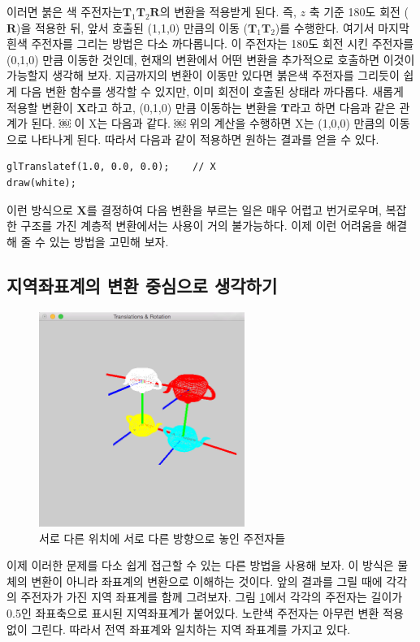 이러면 붉은 색 주전자는${\mathbf T}_1 {\mathbf T}_2  {\mathbf R}$의 변환을 적용받게 된다. 
즉, $z$ 축 기준 180도 회전 ($\mathbf R$)을 적용한 뒤, 앞서 호출된 (1,1,0) 만큼의 이동 (${\mathbf T}_1 {\mathbf T}_2$)를 수행한다.
여기서 마지막 흰색 주전자를 그리는 방법은 다소 까다롭니다. 이 주전자는 180도 회전 시킨 주전자를 (0,1,0) 만큼 이동한 것인데, 
현재의 변환에서 어떤 변환을 추가적으로 호출하면 이것이 가능할지 생각해 보자. 
지금까지의 변환이 이동만 있다면 붉은색 주전자를 그리듯이 쉽게 다음 변환 함수를 생각할 수 있지만, 이미 회전이 호출된 상태라 까다롭다.
새롭게 적용할 변환이 $\mathbf  X$라고 하고, (0,1,0) 만큼 이동하는 변환을 ${\mathbf T}$라고 하면 다음과 같은 관계가 된다.
￼
이 X는 다음과 같다.
￼
위의 계산을 수행하면 X는 (1,0,0) 만큼의 이동으로 나타나게 된다. 따라서 다음과 같이 적용하면 원하는 결과를 얻을 수 있다.

\begin{verbatim}
glTranslatef(1.0, 0.0, 0.0);	// X
draw(white);
\end{verbatim}

이런 방식으로 ${\mathbf  X}$를 결정하여 다음 변환을 부르는 일은 매우 어렵고 번거로우며, 
복잡한 구조를 가진 계층적 변환에서는 사용이 거의 불가능하다.
이제 이런 어려움을 해결해 줄 수 있는 방법을 고민해 보자.

\subsection{지역좌표계의 변환 중심으로 생각하기}

\begin{figure}[h!]
  \centering
    \includegraphics[height=7cm]{OGL_transform/localCoordXform.png}
    \caption{서로 다른 위치에 서로 다른 방향으로 놓인 주전자들}
    \label{fig:OGL_transform:localCoordXform}
\end{figure}

이제 이러한 문제를 다소 쉽게 접근할 수 있는 다른 방법을 사용해 보자. 이 방식은 물체의 변환이 아니라 좌표계의 변환으로 이해하는 것이다. 앞의 결과를 그릴 때에 각각의 주전자가 가진 지역 좌표계를 함께 그려보자. 그림 \ref{fig:OGL_transform:localCoordXform}에서 각각의 주전자는 길이가 0.5인 좌표축으로 표시된 지역좌표계가 붙어있다.
노란색 주전자는 아무런 변환 적용 없이 그린다. 따라서 전역 좌표계와 일치하는 지역 좌표계를 가지고 있다. 



